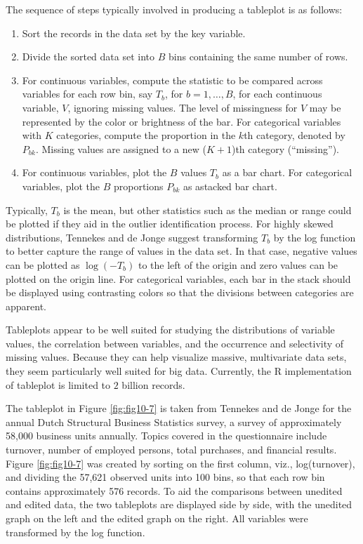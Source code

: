 \documentclass[]{krantz}
\begin{document}
The sequence of steps typically involved in producing a tableplot is as
follows:

\begin{enumerate}
\def\labelenumi{\arabic{enumi}.}
\item
  Sort the records in the data set by the key variable.
\item
  Divide the sorted data set into \(B\) bins containing the same number
  of rows.
\item
  For continuous variables, compute the statistic to be compared across
  variables for each row bin, say \(T_{b}\), for \(b = 1,\ldots ,B\),
  for each continuous variable, \(V\), ignoring missing values. The
  level of missingness for \(V\) may be represented by the color or
  brightness of the bar. For categorical variables with \(K\)
  categories, compute the proportion in the \(k\)th category, denoted by
  \(P_{bk}\). Missing values are assigned to a new (\(K+1\))th category
  (``missing'').
\item
  For continuous variables, plot the \(B\) values \(T_{b}\) as a bar
  chart. For categorical variables, plot the \(B\) proportions
  \(P_{bk}\) as astacked bar chart.
\end{enumerate}

Typically, \(T_{b}\) is the mean, but other statistics such as the
median or range could be plotted if they aid in the outlier
identification process. For highly skewed distributions, Tennekes and de
Jonge \citeyearpar{tennekes2011top} suggest transforming \(T_{b}\) by
the log function to better capture the range of values in the data set.
In that case, negative values can be plotted as \(\log(-T_{b})\) to the
left of the origin and zero values can be plotted on the origin line.
For categorical variables, each bar in the stack should be displayed
using contrasting colors so that the divisions between categories are
apparent.

Tableplots appear to be well suited for studying the distributions of
variable values, the correlation between variables, and the occurrence
and selectivity of missing values. Because they can help visualize
massive, multivariate data sets, they seem particularly well suited for
big data. Currently, the R implementation of tableplot is limited to
\(2\) billion records.

The tableplot in Figure \ref{fig:fig10-7} is taken from Tennekes and de
Jonge \citeyearpar{tennekes2011top} for the annual Dutch Structural
Business Statistics survey, a survey of approximately 58,000 business
units annually. Topics covered in the questionnaire include turnover,
number of employed persons, total purchases, and financial results.
Figure \ref{fig:fig10-7} was created by sorting on the first column,
viz., log(turnover), and dividing the 57,621 observed units into 100
bins, so that each row bin contains approximately 576 records. To aid
the comparisons between unedited and edited data, the two tableplots are
displayed side by side, with the unedited graph on the left and the
edited graph on the right. All variables were transformed by the log
function.
\end{document}
